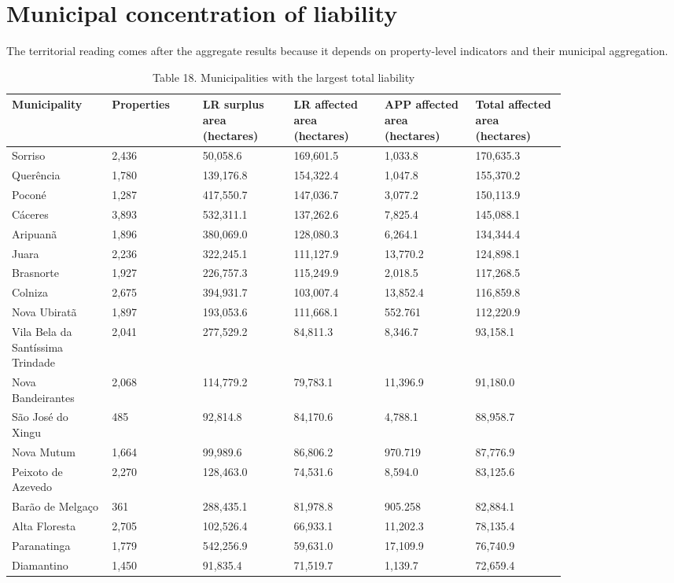 \documentclass[12pt]{article}
\begin{document}
\section*{Municipal concentration of liability}

The territorial reading comes after the aggregate results because it depends on property-level indicators and their municipal aggregation.

\begin{table}[H]
\centering
\caption{Table 18. Municipalities with the largest total liability}
{\fontsize{12}{14}\selectfont
\setlength{\tabcolsep}{3pt}
\renewcommand{\arraystretch}{1.08}
\begin{tabular}{p{0.137\linewidth}p{0.137\linewidth}p{0.137\linewidth}p{0.137\linewidth}p{0.137\linewidth}p{0.137\linewidth}}
\toprule
Municipality & Properties & LR surplus area (hectares) & LR affected area (hectares) & APP affected area (hectares) & Total affected area (hectares) \\
\midrule
Sorriso & 2,436 & 50,058.6 & 169,601.5 & 1,033.8 & 170,635.3 \\
Querência & 1,780 & 139,176.8 & 154,322.4 & 1,047.8 & 155,370.2 \\
Poconé & 1,287 & 417,550.7 & 147,036.7 & 3,077.2 & 150,113.9 \\
Cáceres & 3,893 & 532,311.1 & 137,262.6 & 7,825.4 & 145,088.1 \\
Aripuanã & 1,896 & 380,069.0 & 128,080.3 & 6,264.1 & 134,344.4 \\
Juara & 2,236 & 322,245.1 & 111,127.9 & 13,770.2 & 124,898.1 \\
Brasnorte & 1,927 & 226,757.3 & 115,249.9 & 2,018.5 & 117,268.5 \\
Colniza & 2,675 & 394,931.7 & 103,007.4 & 13,852.4 & 116,859.8 \\
Nova Ubiratã & 1,897 & 193,053.6 & 111,668.1 & 552.761 & 112,220.9 \\
Vila Bela da Santíssima Trindade & 2,041 & 277,529.2 & 84,811.3 & 8,346.7 & 93,158.1 \\
Nova Bandeirantes & 2,068 & 114,779.2 & 79,783.1 & 11,396.9 & 91,180.0 \\
São José do Xingu & 485 & 92,814.8 & 84,170.6 & 4,788.1 & 88,958.7 \\
Nova Mutum & 1,664 & 99,989.6 & 86,806.2 & 970.719 & 87,776.9 \\
Peixoto de Azevedo & 2,270 & 128,463.0 & 74,531.6 & 8,594.0 & 83,125.6 \\
Barão de Melgaço & 361 & 288,435.1 & 81,978.8 & 905.258 & 82,884.1 \\
Alta Floresta & 2,705 & 102,526.4 & 66,933.1 & 11,202.3 & 78,135.4 \\
Paranatinga & 1,779 & 542,256.9 & 59,631.0 & 17,109.9 & 76,740.9 \\
Diamantino & 1,450 & 91,835.4 & 71,519.7 & 1,139.7 & 72,659.4 \\
\bottomrule
\end{tabular}
}
\end{table}
\end{document}
